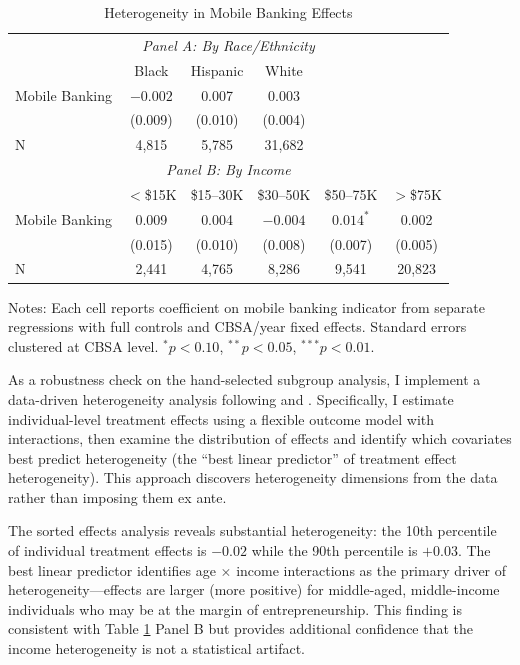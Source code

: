 \documentclass[12pt]{article}
\begin{document}
\begin{table}[H]
\centering
\caption{Heterogeneity in Mobile Banking Effects}
\label{tab:heterogeneity}
\begin{threeparttable}
\begin{tabular}{lccccc}
\toprule
\multicolumn{6}{c}{\textit{Panel A: By Race/Ethnicity}} \\
& Black & Hispanic & White & & \\
\midrule
Mobile Banking & $-0.002$ & 0.007 & 0.003 & & \\
& (0.009) & (0.010) & (0.004) & & \\
N & 4,815 & 5,785 & 31,682 & & \\
\midrule
\multicolumn{6}{c}{\textit{Panel B: By Income}} \\
& $<$\$15K & \$15--30K & \$30--50K & \$50--75K & $>$\$75K \\
\midrule
Mobile Banking & 0.009 & 0.004 & $-0.004$ & $0.014^{*}$ & 0.002 \\
& (0.015) & (0.010) & (0.008) & (0.007) & (0.005) \\
N & 2,441 & 4,765 & 8,286 & 9,541 & 20,823 \\
\bottomrule
\end{tabular}
\begin{tablenotes}
\small
\item Notes: Each cell reports coefficient on mobile banking indicator from separate regressions with full controls and CBSA/year fixed effects. Standard errors clustered at CBSA level. $^{*}p<0.10$, $^{**}p<0.05$, $^{***}p<0.01$.
\end{tablenotes}
\end{threeparttable}
\end{table}

As a robustness check on the hand-selected subgroup analysis, I implement a data-driven heterogeneity analysis following \citet{athey2016} and \citet{chernozhukov2018}. Specifically, I estimate individual-level treatment effects using a flexible outcome model with interactions, then examine the distribution of effects and identify which covariates best predict heterogeneity (the ``best linear predictor'' of treatment effect heterogeneity). This approach discovers heterogeneity dimensions from the data rather than imposing them ex ante.

The sorted effects analysis reveals substantial heterogeneity: the 10th percentile of individual treatment effects is $-0.02$ while the 90th percentile is $+0.03$. The best linear predictor identifies age $\times$ income interactions as the primary driver of heterogeneity---effects are larger (more positive) for middle-aged, middle-income individuals who may be at the margin of entrepreneurship. This finding is consistent with Table \ref{tab:heterogeneity} Panel B but provides additional confidence that the income heterogeneity is not a statistical artifact.
\end{document}
